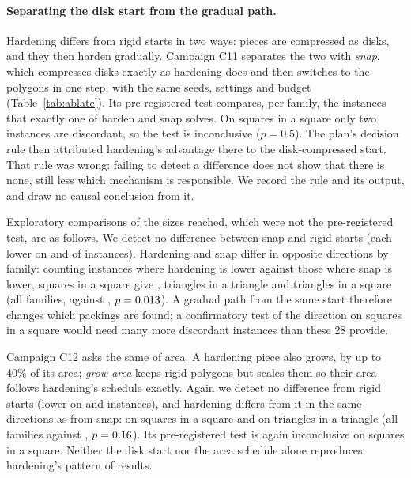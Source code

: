 
\paragraph{Separating the disk start from the gradual path.} Hardening differs from rigid starts in two ways: pieces are compressed as disks, and they then harden gradually. Campaign C11 separates the two with \emph{snap}, which compresses disks exactly as hardening does and then switches to the polygons in one step, with the same seeds, settings and budget (Table~\ref{tab:ablate}). Its pre-registered test compares, per family, the instances that exactly one of harden and snap solves. On squares in a square only two instances are discordant, so the test is inconclusive ($p=0.5$). The plan's decision rule then attributed hardening's advantage there to the disk-compressed start. That rule was wrong: failing to detect a difference does not show that there is none, still less which mechanism is responsible. We record the rule and its output, and draw no causal conclusion from it.

Exploratory comparisons of the sizes reached, which were not the pre-registered test, are as follows. We detect no difference between snap and rigid starts (each lower on \SnapRXLower{} and \SnapRRLower{} of \CsevenInstances{} instances). Hardening and snap differ in opposite directions by family: counting instances where hardening is lower against those where snap is lower, squares in a square give \SnapSquSqu{}, triangles in a triangle \SnapTriTri{} and triangles in a square \SnapTriSqu{} (all families, \SnapHLower{} against \SnapXLower, $p=0.013$). A gradual path from the same start therefore changes which packings are found; a confirmatory test of the direction on squares in a square would need many more discordant instances than these 28 provide.

Campaign C12 asks the same of area. A hardening piece also grows, by up to 40\% of its area; \emph{grow-area} keeps rigid polygons but scales them so their area follows hardening's schedule exactly. Again we detect no difference from rigid starts (lower on \AreaRXLower{} and \AreaRRLower{} instances), and hardening differs from it in the same directions as from snap: \AreaSquSqu{} on squares in a square and \AreaTriTri{} on triangles in a triangle (all families \AreaHLower{} against \AreaXLower, $p=0.16$). Its pre-registered test is again inconclusive on squares in a square. Neither the disk start nor the area schedule alone reproduces hardening's pattern of results.

